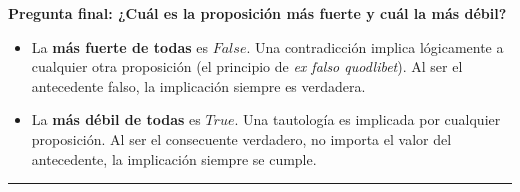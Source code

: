 \vspace{0.4cm}
\textbf{Pregunta final: ¿Cuál es la proposición más fuerte y cuál la más débil?}

\begin{itemize}
    \item La \textbf{más fuerte de todas} es \textbf{$False$}. Una contradicción implica lógicamente a cualquier otra proposición (el principio de \textit{ex falso quodlibet}). Al ser el antecedente falso, la implicación siempre es verdadera.
    \item La \textbf{más débil de todas} es \textbf{$True$}. Una tautología es implicada por cualquier proposición. Al ser el consecuente verdadero, no importa el valor del antecedente, la implicación siempre se cumple.
\end{itemize}

\vspace{0.5cm}
\hrule
\vspace{0.5cm}
